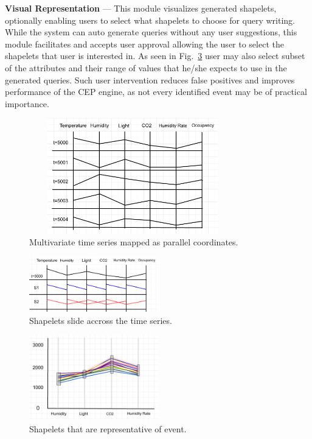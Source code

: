 \documentclass[conference]{IEEEtran}  %
\begin{document}
\textbf{Visual Representation} --- This module visualizes generated shapelets, optionally enabling users to select what shapelets to choose for query writing. While the system can auto generate queries without any user suggestions, this module facilitates and accepts user approval allowing the user to select the shapelets that user is interested in. As seen in Fig.~\ref{fig:tswin} user may also select subset of the attributes and their range of values that he/she expects to use in the generated queries. Such user intervention reduces false positives and improves performance of the CEP engine, as not every identified event may be of practical importance.

\begin{figure}
\includegraphics[width=9cm,height=5cm]{multivariateTime.png}
\caption{Multivariate time series mapped as parallel coordinates.}
\label{fig:tsdata}
\end{figure}

\begin{figure}
\includegraphics[width=0.5\textwidth]{movingWindow.png}
\caption{Shapelets slide accross the time series.}
\label{fig:tsshapes}
\end{figure}

\begin{figure}
\includegraphics[width=0.5\textwidth]{demo.png}
\caption{Shapelets that are representative of event.}
\label{fig:tswin}
\end{figure}
\end{document}
